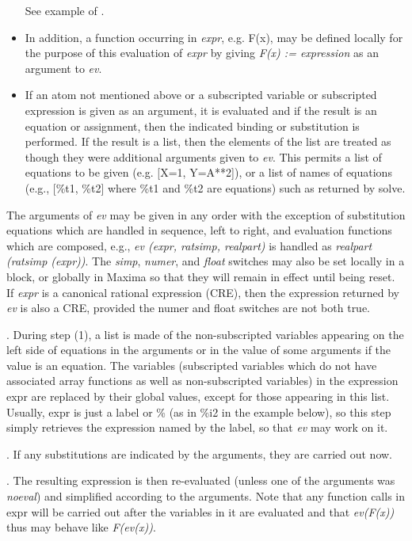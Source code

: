 \documentclass[../Maxima_Workbook.tex]{subfiles}
\begin{document}
\begin{itemize}
	\lz See example of .

	\item In addition, a function occurring in \emph{expr}, e.g. F(x), may be defined locally for the purpose of this evaluation of \emph{expr} by giving \emph{F(x) := expression} as an argument to \emph{ev}.
	\item If an atom not mentioned above or a subscripted variable or subscripted expression is given as an argument, it is evaluated and if the result is an equation or assignment, then the indicated binding or substitution is performed. If the result is a list, then the elements of the list are treated as though they were additional arguments given to \emph{ev}. This permits a list of equations to be given (e.g. [X=1, Y=A**2]), or a list of names of equations (e.g., [\%t1, \%t2] where \%t1 and \%t2 are equations) such as returned by solve.
\end{itemize}

The arguments of \emph{ev} may be given in any order with the exception of substitution equations which are handled in sequence, left to right, and evaluation functions which are composed, e.g., \emph{ev (expr, ratsimp, realpart)} is handled as \emph{realpart (ratsimp (expr))}. The \emph{simp}, \emph{numer}, and \emph{float} switches may also be set locally in a block, or globally in Maxima so that they will remain in effect until being reset. If \emph{expr} is a canonical rational expression (CRE), then the expression returned by \emph{ev} is also a CRE, provided the numer and float switches are not both true.

. During step (1), a list is made of the non-subscripted variables appearing on the left side of equations in the arguments or in the value of some arguments if the value is an equation. The variables (subscripted variables which do not have associated array functions as well as non-subscripted variables) in the expression expr are replaced by their global values, except for those appearing in this list. Usually, expr is just a label or \% (as in \%i2 in the example below), so this step simply retrieves the expression named by the label, so that \emph{ev} may work on it.

. If any substitutions are indicated by the arguments, they are carried out now.

. The resulting expression is then re-evaluated (unless one of the arguments was \emph{noeval}) and simplified according to the arguments. Note that any function calls in expr will be carried out after the variables in it are evaluated and that \emph{ev(F(x))} thus may behave like \emph{F(ev(x))}.
\end{document}
